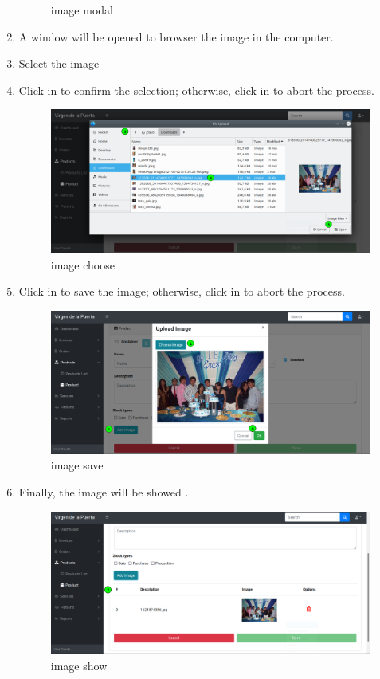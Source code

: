 \documentclass[a4paper,11pt]{refart}
\begin{document}
\begin{enumerate}
\begin{figure}[H]
		\caption{image modal}
		\label{fig:image-modal}
	\end{figure}
	\item A window will be opened to browser the image in the computer.
	\item Select the image
	\item Click in  to confirm the selection; otherwise, click in  to abort the process.
	\begin{figure}[H]\centering
		\includegraphics[width=\textwidth]{images/image-choose.png}
		\caption{image choose}
		\label{fig:image-choose}
	\end{figure}
	\item Click in  to save the image; otherwise, click in  to abort the process.
	\begin{figure}[H]\centering
		\includegraphics[width=\textwidth]{images/image-save.png}
		\caption{image save}
		\label{fig:image-save}
	\end{figure}
	\item Finally, the image will be showed .
	\begin{figure}[H]\centering
		\includegraphics[width=\textwidth]{images/image-show.png}
		\caption{image show}
		\label{fig:image-show}
	\end{figure}
\end{enumerate}
\end{document}
